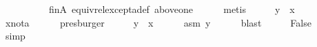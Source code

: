 \begin{isabellebody}
\ \ \ \ \ \ \ \ \ \ fin{\isacharunderscore}{\kern0pt}A\ equiv{\isacharunderscore}{\kern0pt}rel{\isacharunderscore}{\kern0pt}except{\isacharunderscore}{\kern0pt}a{\isacharunderscore}{\kern0pt}def\ above{\isacharunderscore}{\kern0pt}one{}\isanewline
\ \ \ \ \isamarkupfalse%
\ metis\isanewline
\ \ \isamarkupfalse%
\ \isamarkupfalse%
\ {\isachardoublequoteopen}y\ {\isacharequal}{\kern0pt}\ x{\isachardoublequoteclose}\isanewline
\ \ \ \ \isamarkupfalse%
\ x{\isacharunderscore}{\kern0pt}not{\isacharunderscore}{\kern0pt}a\isanewline
\ \ \ \ \isamarkupfalse%
\ presburger\isanewline
\ \ \isamarkupfalse%
\ \isamarkupfalse%
\ {\isachardoublequoteopen}y\ {\isasymnoteq}\ x{\isachardoublequoteclose}\isanewline
\ \ \ \ \isamarkupfalse%
\ asm\ y\isanewline
\ \ \ \ \isamarkupfalse%
\ blast\isanewline
\ \ \isamarkupfalse%
\ \isamarkupfalse%
\ {\isachardoublequoteopen}False{\isachardoublequoteclose}\isanewline
\ \ \ \ \isamarkupfalse%
\ simp\isanewline
{}\isamarkupfalse%
%
\endisatagproof
{\isafoldproof}%
%
\isadelimproof
\isanewline
%
\endisadelimproof
%
\isadelimtheory
\isanewline
%
\endisadelimtheory
%
\isatagtheory
{}\isamarkupfalse%
%
\endisatagtheory
{\isafoldtheory}%
%
\isadelimtheory
%
\endisadelimtheory
%
\end{isabellebody}%
\endinput
